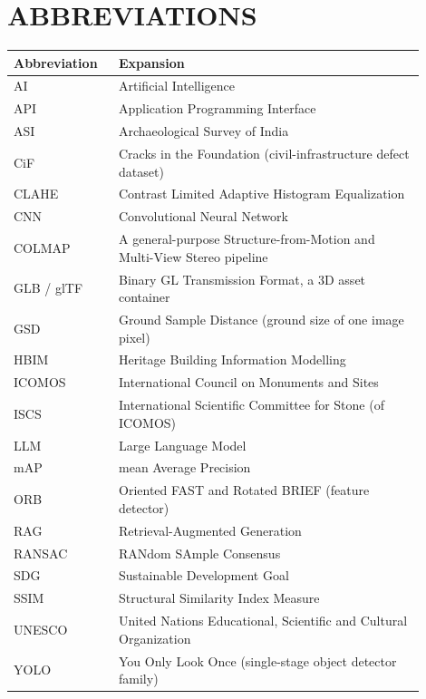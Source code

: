 \documentclass[a4paper,12pt,oneside]{book}
\begin{document}
\chapter*{ABBREVIATIONS}

\begin{center}
\renewcommand{\arraystretch}{1.25}
\begin{tabular}{|p{0.22\linewidth}|p{0.68\linewidth}|}
\hline
\textbf{Abbreviation} & \textbf{Expansion} \\ \hline
AI & Artificial Intelligence \\ \hline
API & Application Programming Interface \\ \hline
ASI & Archaeological Survey of India \\ \hline
CiF & Cracks in the Foundation (civil-infrastructure defect dataset) \\ \hline
CLAHE & Contrast Limited Adaptive Histogram Equalization \\ \hline
CNN & Convolutional Neural Network \\ \hline
COLMAP & A general-purpose Structure-from-Motion and Multi-View Stereo pipeline \\ \hline
GLB / glTF & Binary GL Transmission Format, a 3D asset container \\ \hline
GSD & Ground Sample Distance (ground size of one image pixel) \\ \hline
HBIM & Heritage Building Information Modelling \\ \hline
ICOMOS & International Council on Monuments and Sites \\ \hline
ISCS & International Scientific Committee for Stone (of ICOMOS) \\ \hline
LLM & Large Language Model \\ \hline
mAP & mean Average Precision \\ \hline
ORB & Oriented FAST and Rotated BRIEF (feature detector) \\ \hline
RAG & Retrieval-Augmented Generation \\ \hline
RANSAC & RANdom SAmple Consensus \\ \hline
SDG & Sustainable Development Goal \\ \hline
SSIM & Structural Similarity Index Measure \\ \hline
UNESCO & United Nations Educational, Scientific and Cultural Organization \\ \hline
YOLO & You Only Look Once (single-stage object detector family) \\ \hline
\end{tabular}
\end{center}
\end{document}
